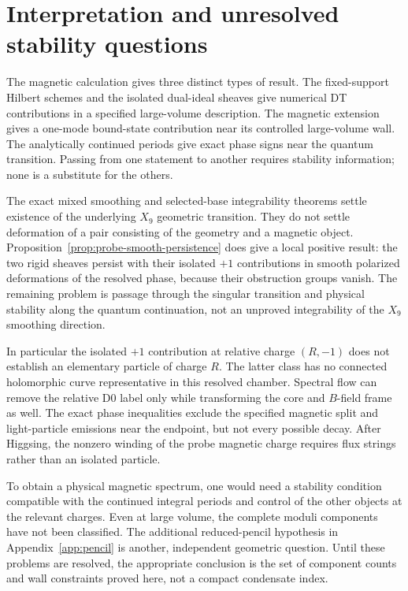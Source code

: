 \section{Interpretation and unresolved stability questions}

The magnetic calculation gives three distinct types of result.
The fixed-support Hilbert schemes and the isolated dual-ideal
sheaves give numerical DT contributions in a specified
large-volume description. The magnetic extension gives a
one-mode bound-state contribution near its controlled
large-volume wall. The analytically continued periods give
exact phase signs near the quantum transition. Passing from
one statement to another requires stability information;
none is a substitute for the others.

The exact mixed smoothing and selected-base integrability theorems
\cite{Wuebben:2026smoothing} settle existence of the underlying $X_9$
geometric transition. They do not settle deformation of a pair consisting
of the geometry and a magnetic object. Proposition~\ref{prop:probe-smooth-persistence}
does give a local positive result: the two rigid sheaves persist with
their isolated $+1$ contributions in smooth polarized deformations of the
resolved phase, because their obstruction groups vanish. The remaining
problem is passage through the singular transition and physical
stability along the quantum continuation, not an unproved integrability
of the $X_9$ smoothing direction.

In particular the isolated $+1$ contribution at relative
charge $(R,-1)$ does not establish an elementary particle of
charge $R$. The latter class has no connected holomorphic
curve representative in this resolved chamber. Spectral flow
can remove the relative D0 label only while transforming the
core and $B$-field frame as well. The exact phase inequalities
exclude the specified magnetic split and light-particle
emissions near the endpoint, but not every possible decay.
After Higgsing, the nonzero winding of the probe magnetic
charge requires flux strings rather than an isolated particle.

To obtain a physical magnetic spectrum, one would need a
stability condition compatible with the continued integral
periods and control of the other objects at the relevant
charges. Even at large volume, the complete moduli components
have not been classified. The additional reduced-pencil
hypothesis in Appendix~\ref{app:pencil} is another, independent
geometric question. Until these problems are resolved, the
appropriate conclusion is the set of component counts and
wall constraints proved here, not a compact condensate index.
